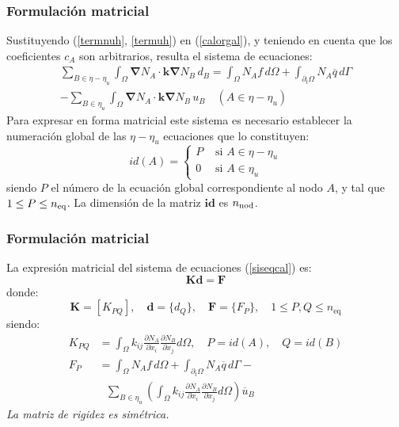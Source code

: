 \documentclass{beamer}
\begin{document}
\begin{frame}
\frametitle{Formulación matricial}

Sustituyendo (\ref{termnuh}, \ref{termuh}) en (\ref{calorgal}), y teniendo
en cuenta que los coeficientes $c_A$ son arbitrarios, resulta el 
sistema de ecuaciones:
\begin{multline}
\sum_{B \in \eta-\eta_u} \int_{\Omega} \bm{\nabla} N_A \cdot \bm{k} \bm{\nabla} N_B \, d_B=
\int_{\Omega} N_A f \, d\Omega+
\int_{\partial_t \Omega} N_A \overline{q} \, d\Gamma \\
- \sum_{B \in \eta_u} \int_{\Omega} \bm{\nabla} N_A \cdot \bm{k} \bm{\nabla} N_B \, u_B
\quad (A \in \eta-\eta_u) \label{siseqcal}
\end{multline}
Para expresar en forma matricial este sistema
es necesario establecer la numeración global de las $\eta-\eta_u$ ecuaciones
que lo constituyen:
\begin{equation}
id(A)=\left\{
\begin{array}{ll}
P & \textrm{ si } A \in \eta-\eta_u \\
0 & \textrm{ si } A \in \eta_u
\end{array}
\right. \label{idmcalor}
\end{equation}
siendo $P$ el número de la ecuación global correspondiente al nodo $A$, y tal
que $1 \leq P \leq n_{\rm eq}$. La dimensión de la matriz $\bm{id}$ es $n_{\rm nod}$.
\end{frame}
\begin{frame}
\frametitle{Formulación matricial}
La expresión matricial del sistema de ecuaciones (\ref{siseqcal}) es:
\begin{equation}
\mathbf{K} \bm{d}=\bm{F}
\end{equation}
donde:
\begin{equation}
\bm{K}= [K_{PQ}]                                        ,\quad
\bm{d}= \{d_Q\}                                              ,\quad
\bm{F}= \{F_P\}                                              ,\quad
1 \leq P,Q \leq n_{\textrm{eq}}
\end{equation}
siendo:
\begin{align}
K_{PQ}&=\int_{\Omega} k_{ij} \frac{\partial N_A}{\partial x_i}
                             \frac{\partial N_B}{\partial x_j}
                             d \Omega                        ,\quad
P=id(A)                                                      ,\quad
Q=id(B)
                                                             \label{kglpoi} \\
F_P&= \int_{\Omega} N_A f \, d\Omega+
      \int_{\partial_t \Omega} N_A \overline{q} \, d\Gamma
     -                                                       \nonumber \\
   &\mbox{ } \sum_{B \in \eta_u} \left(
      \int_{\Omega} k_{ij} \frac{\partial N_A}{\partial x_i}
      \frac{\partial N_B}{\partial x_j} d \Omega
                          \right) \overline{u}_B
\end{align}
{\em La matriz de rigidez es simétrica.}
\end{frame}
\end{document}
